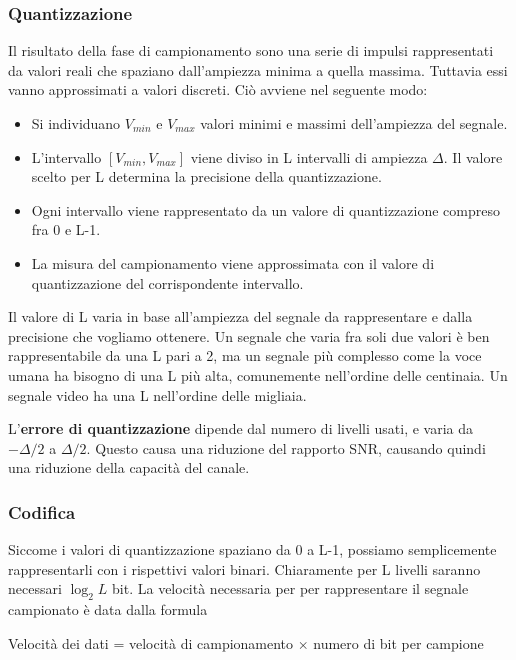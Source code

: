         \subsubsection{Quantizzazione}
            Il risultato della fase di campionamento sono una serie di impulsi rappresentati da valori reali che spaziano dall'ampiezza minima a quella massima. Tuttavia essi vanno approssimati a valori discreti. Ciò avviene nel seguente modo:
            \begin{itemize}
                \item Si individuano $V_{min}$ e $V_{max}$ valori minimi e massimi dell'ampiezza del segnale.
                
                \item L'intervallo $[V_{min}, V_{max}]$ viene diviso in L intervalli di ampiezza $\Delta$. Il valore scelto per L determina la precisione della quantizzazione.
                
                \item Ogni intervallo viene rappresentato da un valore di quantizzazione compreso fra 0 e L-1.
                
                \item La misura del campionamento viene approssimata con il valore di quantizzazione del corrispondente intervallo.
            \end{itemize}
            
            Il valore di L varia in base all'ampiezza del segnale da rappresentare e dalla precisione che vogliamo ottenere. Un segnale che varia fra soli due valori è ben rappresentabile da una L pari a 2, ma un segnale più complesso come la voce umana ha bisogno di una L più alta, comunemente nell'ordine delle centinaia. Un segnale video ha una L nell'ordine delle migliaia.
            
            L'\textbf{errore di quantizzazione} dipende dal numero di livelli usati, e varia da $-\Delta/2$ a $\Delta/2$. Questo causa una riduzione del rapporto SNR, causando quindi una riduzione della capacità del canale.
            
        \subsubsection{Codifica}
            Siccome i valori di quantizzazione spaziano da 0 a L-1, possiamo semplicemente rappresentarli con i rispettivi valori binari. Chiaramente per L livelli saranno necessari $\log_2L$ bit. La velocità necessaria per per rappresentare il segnale campionato è data dalla formula
            \begin{center}
                Velocità dei dati = velocità di campionamento $\times$ numero di bit per campione
            \end{center}
            
